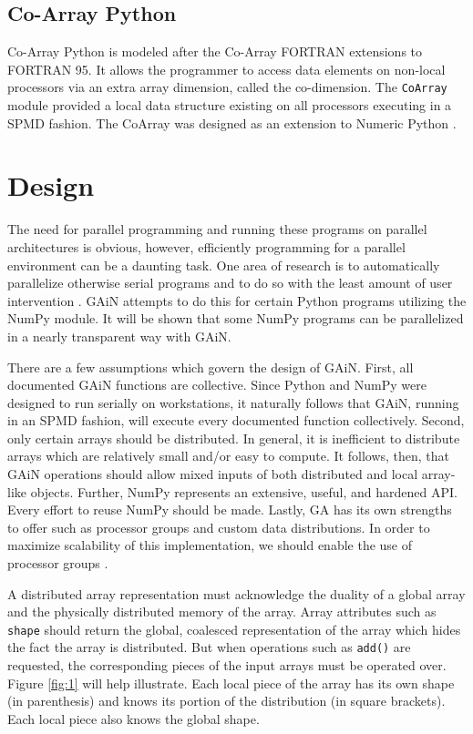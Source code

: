 \documentclass[preprint]{sigplanconf}
\begin{document}
\subsection{Co-Array Python}

Co-Array Python \cite{Ras04} is modeled after the Co-Array FORTRAN extensions
to FORTRAN 95. It allows the programmer to access data elements on non-local
processors via an extra array dimension, called the co-dimension. The
\verb=CoArray= module provided a local data structure existing on all
processors executing in a SPMD fashion. The CoArray was designed as an
extension to Numeric Python \cite{Asc99}.

\section{Design}


The need for parallel programming and running these programs on parallel
architectures is obvious, however, efficiently programming for a parallel
environment can be a daunting task. One area of research is to automatically
parallelize otherwise serial programs and to do so with the least amount of
user intervention \cite{Buy99}. GAiN attempts to do this for certain Python
programs utilizing the NumPy module. It will be shown that some NumPy programs
can be parallelized in a nearly transparent way with GAiN.

There are a few assumptions which govern the design of GAiN. First, all
documented GAiN functions are collective. Since Python and NumPy were designed
to run serially on workstations, it naturally follows that GAiN, running in an
SPMD fashion, will execute every documented function collectively. Second,
only certain arrays should be distributed. In general, it is inefficient to
distribute arrays which are relatively small and/or easy to compute. It
follows, then, that GAiN operations should allow mixed inputs of both
distributed and local array-like objects. Further, NumPy represents an
extensive, useful, and hardened API. Every effort to reuse NumPy should be
made. Lastly, GA has its own strengths to offer such as processor groups and
custom data distributions. In order to maximize scalability of this
implementation, we should enable the use of processor groups \cite{Nie05}.

A distributed array representation must acknowledge the duality of a global
array and the physically distributed memory of the array. Array attributes
such as \verb=shape= should return the global, coalesced representation of the
array which hides the fact the array is distributed. But when operations such
as \verb=add()= are requested, the corresponding pieces of the input arrays
must be operated over. Figure \ref{fig:1} will help illustrate.  Each local
piece of the array has its own shape (in parenthesis) and knows its portion of
the distribution (in square brackets). Each local piece also knows the global
shape.
\end{document}
